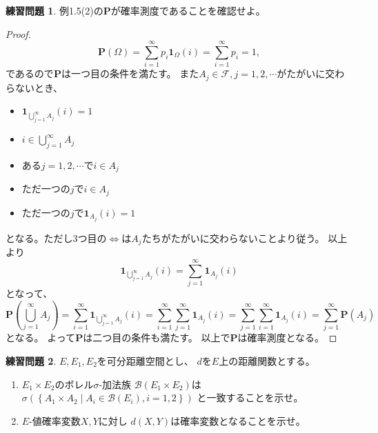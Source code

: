 \documentclass[uplatex]{jsarticle}
\theoremstyle{definition}
\newtheorem{prob}[prob]{練習問題}
\def\P{\mathbf{P}}
\def\I{\mathbf{1}}
\def\mcB{\mathcal{B}}
\def\mcF{\mathcal{F}}
\begin{document}
\begin{prob}\label{prob: 1.2}
  例1.5(2)の\(\P\)が確率測度であることを確認せよ。
\end{prob}

\begin{proof}
  \[
  \P(\Omega) = \sum_{i=1}^\infty p_i\I_{\Omega}(i) = \sum_{i=1}^\infty p_i = 1,
  \]
  であるので\(\P\)は一つ目の条件を満たす。
  また\(A_j\in\mcF, j = 1,2,\cdots \)がたがいに交わらないとき、
  \begin{itemize}
    \item[ \ ]
    \(\I_{\bigcup_{j=1}^\infty A_j}(i) = 1\)
    \item[\(\iff\)]
    \(i\in \bigcup_{j=1}^\infty A_j\)
    \item[\(\iff\)]
    ある\(j=1,2,\cdots\)で\(i\in A_j\)
    \item[\(\iff\)]
    ただ一つの\(j\)で\(i\in A_j\)
    \item[\(\iff\)]
    ただ一つの\(j\)で\(\I_{A_j}(i)=1\)
  \end{itemize}
  となる。ただし3つ目の\(\iff\)は\(A_j\)たちがたがいに交わらないことより従う。
  以上より
  \[
  \I_{\bigcup_{j=1}^\infty A_j}(i) = \sum_{j=1}^\infty \I_{A_j}(i)
  \]
  となって、
  \[
  \P(\bigcup_{j=1}^\infty A_j)
  = \sum_{i=1}^\infty \I_{\bigcup_{j=1}^\infty A_j}(i)
  = \sum_{i=1}^\infty \sum_{j=1}^\infty \I_{A_j}(i)
  = \sum_{j=1}^\infty \sum_{i=1}^\infty \I_{A_j}(i)
  = \sum_{j=1}^\infty \P(A_j)
  \]
  となる。
  よって\(\P\)は二つ目の条件も満たす。
  以上で\(\P\)は確率測度となる。
\end{proof}






\begin{prob}\label{prob: 1.3}
  \(E,E_1,E_2\)を可分距離空間とし、
  \(d\)を\(E\)上の距離関数とする。
  \begin{enumerate}
    \item \label{enumi: 1.3-1}
    \(E_1\times E_2\)のボレル\(\sigma\)-加法族
    \(\mcB(E_1\times E_2)\)は
    \(\sigma\left(\left\{ A_1\times A_2
    \middle| A_i\in \mcB(E_i),i=1,2\right\} \right)\)
    と一致することを示せ。
    \item \label{enumi: 1.3-2}
    \(E\)-値確率変数\(X,Y\)に対し
    \(d(X,Y)\)は確率変数となることを示せ。
  \end{enumerate}
\end{prob}
\end{document}
